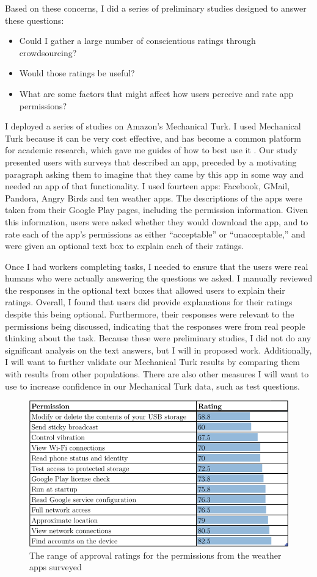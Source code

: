 \documentclass[11pt]{article}
\begin{document}
Based on these concerns, I did a series of preliminary studies designed to answer
these questions:
\begin{itemize}
\item Could I gather a large number of conscientious ratings through crowdsourcing?
\item Would those ratings be useful?
\item What are some factors that might affect how users perceive and rate 
app permissions?
\end{itemize}
I deployed a series of studies on Amazon's Mechanical Turk. I used
Mechanical Turk because it can be very cost effective, and has become
a common platform for academic research, which gave me guides of how
to best use it \cite{reseach-mturk-BRM12, mturk-data-quality-PPS11}. 
Our study presented users with surveys that
described an app, preceded by a motivating paragraph asking
them to imagine that they came by this app in some way and needed an
app of that functionality.  I used fourteen apps: Facebook, GMail,
Pandora, Angry Birds and ten weather apps.  The descriptions
of the apps were taken from their Google Play pages, including the
permission information. Given this information, users were asked
whether they would download the app, and to rate each of the app's
permissions as either ``acceptable'' or ``unacceptable,'' and were
given an optional text box to explain each of their ratings.

Once I had workers completing tasks, I needed to ensure that the
users were real humans who were actually answering the questions we
asked. I manually reviewed the responses in the optional text boxes
that allowed users to explain their ratings. Overall, I found that
users did provide explanations for their ratings despite this being
optional. Furthermore, their responses were relevant to the
permissions being discussed, indicating that the responses were from
real people thinking about the task. Because these were preliminary
studies, I did not do any significant analysis on the text answers,
but I will in proposed work. Additionally, I will want to further
validate our Mechanical Turk results by comparing them with results
from other populations. There are also other measures I will want to
use to increase confidence in our Mechanical Turk data, such as test
questions.

\begin{figure}[t]
\centering
    \includegraphics[width=.6\linewidth]{img/RatingTable.png}
    \vspace{1pt}
    \caption{The range of approval ratings for the permissions from the 
    weather apps surveyed}
    \label{weatherratings}
\end{figure}
\end{document}
